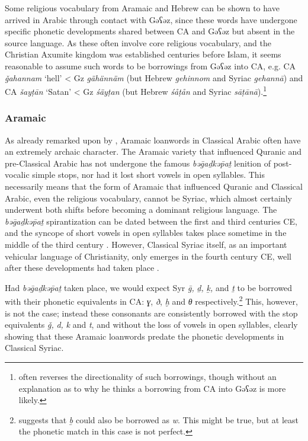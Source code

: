 \documentclass[output=paper]{langsci/langscibook}
\begin{document}
Some religious vocabulary from Aramaic and Hebrew can be shown to have arrived in Arabic through contact with Gəʕəz, since these words have undergone specific phonetic developments shared between CA and Gəʕəz but absent in the source language. As these often involve core religious vocabulary, and the Christian Axumite kingdom was established centuries before Islam, it seems reasonable to assume such words to be borrowings from Gəʕəz into CA, e.g. CA \textit{ǧahannam} ‘hell’ < Gz \textit{gähännäm} (but Hebrew \textit{gehinnom} and Syriac \textit{gehannā}) and CA \textit{šayṭān} ‘Satan’ < Gz \textit{śäyṭan} (but Hebrew \textit{śåṭån} and Syriac \textit{sāṭānā}).\footnote{\citet{Leslau1990} often reverses the directionality of such borrowings, though without an explanation as to why he thinks a borrowing from CA into Gəʕəz is more likely.}

\subsubsection{\label{bkm:Ref13224460}Aramaic}

As already remarked upon by \citet{Retsö2011}, Aramaic loanwords in Classical Arabic often have an extremely archaic character. The Aramaic variety that influenced Quranic and pre-Classical Arabic has not undergone the famous \textit{bəḡaḏkə\={p}aṯ} lenition of post-vocalic simple stops, nor had it lost short vowels in open syllables. This necessarily means that the form of Aramaic that influenced Quranic and Classical Arabic, even the religious vocabulary, cannot be Syriac, which almost certainly underwent both shifts before becoming a dominant religious language. The \textit{bəḡaḏkə\={p}aṯ} spirantization can be dated between the first and third centuries CE, and the syncope of short vowels in open syllables takes place sometime in the middle of the third century \citep[41--42]{Gzella2015}. However, Classical Syriac itself, as an important vehicular language of Christianity, only emerges in the fourth century CE, well after these developments had taken place \citep[259]{Gzella2015}.

Had \textit{bəḡaḏkə\={p}aṯ} taken place, we would expect Syr \textit{ḡ,} \textit{ḏ,} \textit{ḵ,} and \textit{ṯ} to be borrowed with their phonetic equivalents in CA: \textit{ɣ}, \textit{ð}, \textit{ḫ} and \textit{θ} respectively.\footnote{\cite{Retsö2011} suggests that \textit{ḇ} could also be borrowed as \textit{w}. This might be true, but at least the phonetic match in this case is not perfect.} This, however, is not the case; instead these consonants are consistently borrowed with the stop equivalents \textit{ǧ,} \textit{d,} \textit{k} and \textit{t}, and without the loss of vowels in open syllables, clearly showing that these Aramaic loanwords predate the phonetic developments in Classical Syriac.
\end{document}
